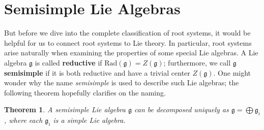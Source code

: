 \documentclass{article}
\newtheorem{theorem}{Theorem}
\theoremstyle{definition}
\begin{document}
\section{Semisimple Lie Algebras}
\quad But before we dive into the complete classification of root systems, it would be helpful for us to connect root systems to Lie theory. In particular, root systems arise naturally when examining the properties of some special Lie algebras. A Lie algebra $\mathfrak{g}$ is called \textbf{reductive} if $\mbox{Rad}(\mathfrak{g})=Z(\mathfrak{g})$; furthermore, we call $\mathfrak{g}$ \textbf{semisimple} if it is both reductive and have a trivial center $Z(\mathfrak{g})$. One might wonder why the name \textit{semisimple} is used to describe such Lie algebras; the following theorem hopefully clarifies on the naming. 

\begin{theorem}
A semisimple Lie algebra $\mathfrak{g}$ can be decomposed uniquely as $\mathfrak{g}=\bigoplus\mathfrak{g}_i$, where each $\mathfrak{g}_i$ is a \textit{simple} Lie algebra. 
\end{theorem}
\end{document}

